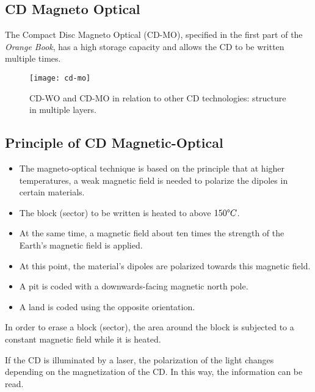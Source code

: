 \subsection*{CD Magneto Optical}
The Compact Disc Magneto Optical (CD-MO), specified in the first part of the \textit{Orange Book}, has a high storage capacity and allows the CD to be written multiple times.

\begin{figure}[ht!]
	\centering
	\texttt{[image: cd-mo]}
	\caption[CD-WO and CD-MO in relation to other CD technologies.]{CD-WO and CD-MO in relation to other CD technologies: structure in multiple layers.}\label{fig:cd-mo}
\end{figure}


\subsection[Principle of CD-MO]{Principle of CD Magnetic-Optical}
\begin{itemize}
	\item The magneto-optical technique is based on the principle that at higher temperatures, a weak magnetic field is needed to polarize the dipoles in certain materials. 
	\item The block (sector) to be written is heated to above $150 \degree C$. 
	\item At the same time, a magnetic field about ten times the strength of the Earth’s magnetic field is applied. 
	\item At this point, the material’s dipoles are polarized towards this magnetic field.
	\item A pit is coded with a downwards-facing magnetic north pole. 
	\item A land is coded using the opposite orientation.
\end{itemize}

In order to erase a block (sector), the area around the block is subjected to a constant magnetic field while it is heated.

If the CD is illuminated by a laser, the polarization of the light changes depending on the magnetization of the CD. In this way, the information can be read.

